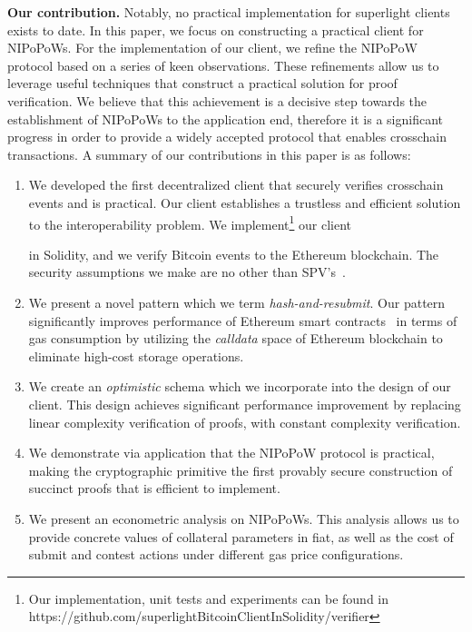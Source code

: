 \textbf{Our contribution.} Notably, no practical implementation for superlight
clients exists to date. In this paper, we focus on constructing a practical
client for NIPoPoWs. For the implementation of our client, we refine the
NIPoPoW protocol based on a series of keen observations. These refinements
allow us to leverage useful techniques that construct a practical solution for
proof verification. We believe that this achievement is a decisive step towards
the establishment of NIPoPoWs to the application end, therefore it is a
significant progress in order to provide a widely accepted protocol that
enables crosschain transactions. A summary of our contributions in this paper
is as follows:
\begin{enumerate}
\item We developed the first decentralized client that securely verifies
crosschain events and is practical. Our client establishes a trustless and
efficient solution to the interoperability problem. We implement\footnote{Our
implementation, unit tests and experiments can be found in https://github.com/superlightBitcoinClientInSolidity/verifier} our client

in Solidity, and we verify Bitcoin events to the Ethereum blockchain. The
security assumptions we make are no other than
SPV's~\cite{eclipse, eclipse-ethereum}.
\item We present a novel pattern which we term \emph{hash-and-resubmit}. Our
pattern significantly improves performance of Ethereum smart
contracts~\cite{wood, buterin} in terms of gas consumption by utilizing the
\emph{calldata} space of Ethereum blockchain to eliminate high-cost storage
operations.
\item We create an \emph{optimistic} schema which we incorporate into the design
of our client. This design achieves significant performance improvement by
replacing linear complexity verification of proofs, with constant complexity
verification.
\item We demonstrate via application that the NIPoPoW protocol is practical,
making the cryptographic primitive the first provably secure construction of
succinct proofs that is efficient to implement.
\item We present an econometric analysis on NIPoPoWs. This analysis allows us
to provide concrete values of collateral parameters in fiat, as well as the
cost of submit and contest actions under different gas price configurations.

\end{enumerate}

